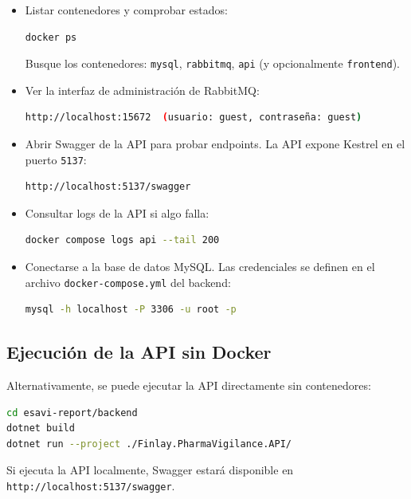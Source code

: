 \documentclass[12pt,letterpaper]{article}
\begin{document}
\begin{itemize}
    \item Listar contenedores y comprobar estados:
    \begin{lstlisting}[language=bash]
docker ps
    \end{lstlisting}
    Busque los contenedores: \texttt{mysql}, \texttt{rabbitmq}, \texttt{api} (y opcionalmente \texttt{frontend}).

    \item Ver la interfaz de administración de RabbitMQ:
    \begin{lstlisting}[language=bash]
http://localhost:15672  (usuario: guest, contraseña: guest)
    \end{lstlisting}

    \item Abrir Swagger de la API para probar endpoints. La API expone Kestrel en el puerto \texttt{5137}:
    \begin{lstlisting}[language=bash]
http://localhost:5137/swagger
    \end{lstlisting}

    \item Consultar logs de la API si algo falla:
    \begin{lstlisting}[language=bash]
docker compose logs api --tail 200
    \end{lstlisting}

    \item Conectarse a la base de datos MySQL. Las credenciales se definen en el archivo \texttt{docker-compose.yml} del backend:
    \begin{lstlisting}[language=bash]
mysql -h localhost -P 3306 -u root -p
    \end{lstlisting}
\end{itemize}

\subsection{Ejecución de la API sin Docker}

Alternativamente, se puede ejecutar la API directamente sin contenedores:

\begin{lstlisting}[language=bash]
cd esavi-report/backend
dotnet build
dotnet run --project ./Finlay.PharmaVigilance.API/
\end{lstlisting}

Si ejecuta la API localmente, Swagger estará disponible en \texttt{http://localhost:5137/swagger}.
\end{document}

